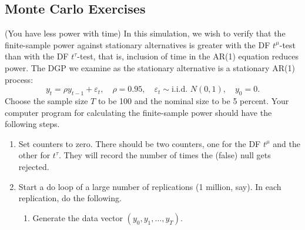 \begin{problemset}
\subsection*{Monte Carlo Exercises}

\exercise[1]
(You have less power with time) \enspace In this simulation, we wish to verify that the
finite-sample power against stationary alternatives is greater with the DF $t^\mu$-test
than with the DF $t^\tau$-test, that is, inclusion of time in the AR(1) equation reduces
power. The DGP we examine as the stationary alternative is a stationary AR(1)
process:
\[
y_t = \rho y_{t-1} + \varepsilon_t, \quad \rho = 0.95, \quad
\varepsilon_t \sim \text{i.i.d.\ } N(0, 1), \quad y_0 = 0.
\]
Choose the sample size $T$ to be 100 and the nominal size to be 5 percent.
Your computer program for calculating the finite-sample power should have the
following steps.
\begin{enumerate}
\item Set counters to zero. There should be two counters, one for the DF $t^\mu$ and
the other for $t^\tau$. They will record the number of times the (false) null gets
rejected.

\item Start a do loop of a large number of replications (1 million, say). In each
replication, do the following.

\begin{enumerate}[label=(\roman*)]
\item Generate the data vector $(y_0, y_1, \ldots, y_T)$.


\end{enumerate}
\end{enumerate}
\end{problemset}
